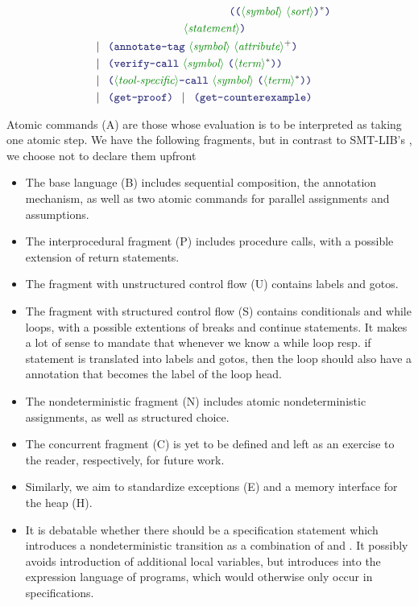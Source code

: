 \documentclass[runningheads]{llncs}
\begin{document}
\begin{align}
    & \hspace*{4.42cm} \LP \LP \nonterminal{symbol}~\nonterminal{sort}\RP\rstar \RP
        \notag \\
    & \hspace*{3.0cm} \nonterminal{statement} \notag \RP \\
    & \alt
        \LP \terminal{annotate-tag}~
            \nonterminal{symbol}~
            \nonterminal{attribute}\rplus
        \RP \notag \\
    & \alt
        \LP \terminal{verify-call}~
            \nonterminal{symbol}~
            \LP \nonterminal{term}\rstar \RP
        \RP \notag \\
    & \alt
        \LP \nonterminal{tool-specific}\terminal{-call}~
            \nonterminal{symbol}~
            \LP \nonterminal{term}\rstar \RP
        \RP \notag \\
    & \alt
        \LP \terminal{get-proof} \RP \alt \LP \terminal{get-counterexample} \RP \notag
\end{align}

\noindent
Atomic commands (A) are those whose evaluation is to be interpreted
as taking one atomic step.
We have the following fragments, but in contrast to SMT-LIB's ,
we choose not to declare them upfront
\begin{itemize}
\item The base language (B) includes sequential composition,
      the annotation mechanism,
      as well as two atomic commands for
      parallel assignments and assumptions.
\item The interprocedural fragment (P) includes procedure calls,
      with a possible extension of return statements.
\item The fragment with unstructured control flow (U)
      contains labels and gotos.
\item The fragment with structured control flow (S)
      contains conditionals and while loops,
      with a possible extentions of breaks and continue statements.
      It makes a lot of sense to mandate that whenever
      we know a while loop resp. if statement is translated into labels and gotos,
      then the loop should also have a  annotation
      that becomes the label of the loop head.
\item The nondeterministic fragment (N)
      includes atomic nondeterministic assignments,
      as well as structured choice.
\item The concurrent fragment (C) is yet to be defined
      and left as an exercise to the reader, respectively,
      for future work.
\item Similarly, we aim to standardize exceptions (E) and a memory interface for the heap (H).
\item It is debatable whether there should be a specification statement
      which introduces a nondeterministic transition as a combination
      of  and .
      It possibly avoids introduction of additional local variables,
      but introduces  into the expression language of programs,
      which would otherwise only occur in specifications.
\end{itemize}
\end{document}

